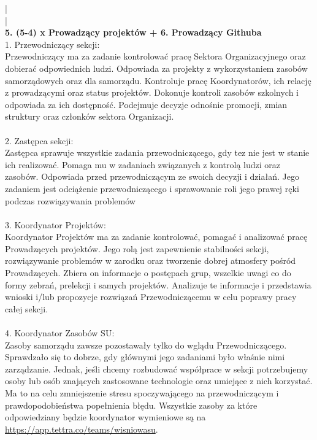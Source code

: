 \documentclass[9pt,a4paper]{report}
\begin{document}
|\\ 

|\\ 

\textbf{5. (5-4) x Prowadzący projektów + 6. Prowadzący Githuba}\\ 

 

1. Przewodniczący sekcji:\\ 

Przewodniczący ma za zadanie kontrolować pracę Sektora Organizacyjnego oraz dobierać odpowiednich ludzi. Odpowiada za projekty z wykorzystaniem zasobów samorządowych oraz dla samorządu. Kontroluje pracę Koordynatorów, ich relację z prowadzącymi oraz status projektów. Dokonuje kontroli zasobów szkolnych i odpowiada za ich dostępność. Podejmuje decyzje odnośnie promocji, zmian struktury oraz członków sektora Organizacji.\\\\ 

 

2. Zastępca sekcji:\\ 

Zastępca sprawuje wszystkie zadania przewodniczącego, gdy tez nie jest w stanie ich realizować. Pomaga mu w zadaniach związanych z kontrolą ludzi oraz zasobów. Odpowiada przed przewodniczącym ze swoich decyzji i działań. Jego zadaniem jest odciążenie przewodniczącego i sprawowanie roli jego prawej ręki podczas rozwiązywania problemów\\\\ 

 

3. Koordynator Projektów:\\ 

Koordynator Projektów ma za zadanie kontrolować, pomagać i analizować pracę Prowadzących projektów. Jego rolą jest zapewnienie stabilności sekcji, rozwiązywanie problemów w zarodku oraz tworzenie dobrej atmosfery pośród Prowadzących. Zbiera on informacje o postępach grup, wszelkie uwagi co do formy zebrań, prelekcji i samych projektów. Analizuje te informacje i przedstawia wnioski i/lub propozycje rozwiązań Przewodniczącemu w celu poprawy pracy całej sekcji.\\\\ 

 

4. Koordynator Zasobów SU:\\  

Zasoby samorządu zawsze pozostawały tylko do wglądu Przewodniczącego. Sprawdzało się to dobrze, gdy głównymi jego zadaniami było właśnie nimi zarządzanie. Jednak, jeśli chcemy rozbudować współprace w sekcji potrzebujemy osoby lub osób znających zastosowane technologie oraz umiejące z nich korzystać. Ma to na celu zmniejszenie stresu spoczywającego na przewodniczącym i prawdopodobieństwa popełnienia błędu. Wszystkie zasoby za które odpowiedziany będzie koordynator wymieniowe są na \url{https://app.tettra.co/teams/wisniowasu}.\\\\ 
\end{document}
